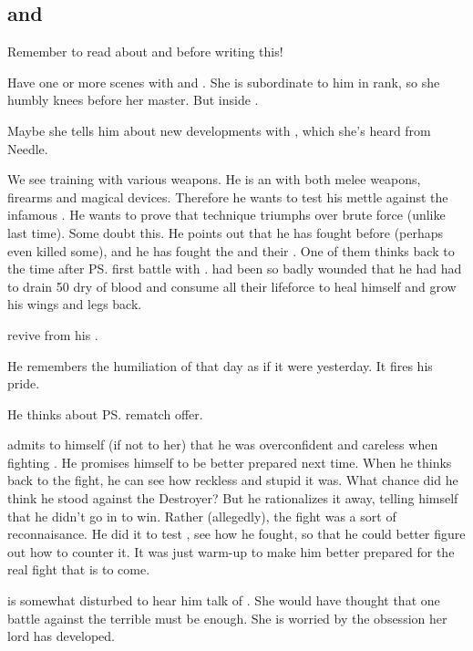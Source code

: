 \subsection{\Achsah{} and \Teshrial}
Remember to read about  and  before writing this! 

Have one or more scenes with \Achsah{} and \Teshrial. She is subordinate to him in rank, so she humbly knees before her master. But inside . 

Maybe she tells him about new developments with \Tiroco, which she's heard from Needle. 

We see \Teshrial{} training with various weapons. 
He is an  with both melee weapons, firearms and magical devices. 
Therefore he wants to test his mettle against the infamous \Ishnaruchaefir. 
He wants to prove that technique triumphs over brute force ({unlike} last time). 
Some \resphain{} doubt this. 
He points out that he has fought \dragons{} before (perhaps even killed some), and he has fought the \Baelzerach{} and their \daemons. 
One of them thinks back to the time after \ps{\Teshrial} first battle with \Ishnaruchaefir. 
\Teshrial{} had been so badly wounded that he had had to drain 50 \humans{} dry of blood and consume all their lifeforce to heal himself and grow his wings and legs back.  

\Menessiaraid {} \Teshrial revive from his .

He remembers the humiliation of that day as if it were yesterday. 
It fires his pride. 

He thinks about {\ps{\Ishnaruchaefir} rematch offer}. 

\Teshrial{} admits to himself (if not to her) that he was overconfident and careless when fighting \Ishnaruchaefir{}. 
He promises himself to be better prepared next time. 
When he thinks back to the fight, he can see how reckless and stupid it was. 
What chance did he think he stood against the Destroyer? 
But he rationalizes it away, telling himself that he didn't go in to win. 
Rather (allegedly), the fight was a sort of reconnaisance. 
He did it to test \Ishnaruchaefir, see how he fought, so that he could better figure out how to counter it. 
It was just warm-up to make him better prepared for the real fight that is to come. 

\Achsah{} is somewhat disturbed to hear him talk of . 
She would have thought that one battle against the terrible \Ishnaruchaefir{} must be enough. 
She is worried by the obsession her lord has developed. 

